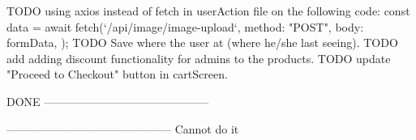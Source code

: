 TODO  using axios instead of fetch in userAction file on the following code: 
       const data = await fetch(`/api/image/image-upload`, {
      method: "POST",
      body: formData,
    });
TODO  Save where the user at (where he/she last seeing).
TODO  add adding discount functionality for admins to the products.
TODO  update "Proceed to Checkout" button in cartScreen.


DONE
--------------------------------------------



--------------------------------------------
Cannot do it

